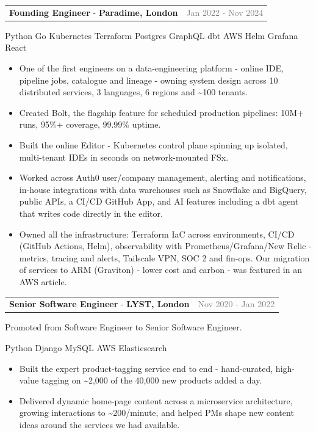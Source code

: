 \documentclass[10pt,a4paper]{extarticle}
\makeatletter
\newcommand{\role}[3]{%
  \vspace{3pt}\noindent\begin{tabularx}{\textwidth}{@{}Xr@{}}
  \textbf{#1} - \textbf{#2} & \textcolor{grey}{\small #3}
  \end{tabularx}\par}
\newcommand{\stack}[1]{{\footnotesize\color{accent}#1}\par\vspace{1pt}}
\newcommand{\progression}[1]{{\footnotesize\color{grey}#1}\par\vspace{1pt}}
\makeatother
\begin{document}
\role{Founding Engineer}{Paradime, London}{Jan 2022 - Nov 2024}
\stack{Python \textcolor{black}{\textbar{}} Go \textcolor{black}{\textbar{}} Kubernetes \textcolor{black}{\textbar{}} Terraform \textcolor{black}{\textbar{}} Postgres \textcolor{black}{\textbar{}} GraphQL \textcolor{black}{\textbar{}} dbt \textcolor{black}{\textbar{}} AWS \textcolor{black}{\textbar{}} Helm \textcolor{black}{\textbar{}} Grafana \textcolor{black}{\textbar{}} React}
\begin{itemize}
\item One of the first engineers on a data-engineering platform - online IDE, pipeline jobs, catalogue and lineage - owning system design across 10 distributed services, 3 languages, 6 regions and \textasciitilde100 tenants.
\item Created Bolt, the flagship feature for scheduled production pipelines: 10M+ runs, 95\%+ coverage, 99.99\% uptime.
\item Built the online Editor - Kubernetes control plane spinning up isolated, multi-tenant IDEs in seconds on network-mounted FSx.
\item Worked across Auth0 user/company management, alerting and notifications, in-house integrations with data warehouses such as Snowflake and BigQuery, public APIs, a CI/CD GitHub App, and AI features including a dbt agent that writes code directly in the editor.
\item Owned all the infrastructure: Terraform IaC across environments, CI/CD (GitHub Actions, Helm), observability with Prometheus/Grafana/New Relic - metrics, tracing and alerts, Tailscale VPN, SOC 2 and fin-ops. Our migration of services to ARM (Graviton) - lower cost and carbon - was featured in an AWS article.
\end{itemize}

\role{Senior Software Engineer}{LYST, London}{Nov 2020 - Jan 2022}
\progression{Promoted from Software Engineer to Senior Software Engineer.}
\stack{Python \textcolor{black}{\textbar{}} Django \textcolor{black}{\textbar{}} MySQL \textcolor{black}{\textbar{}} AWS \textcolor{black}{\textbar{}} Elasticsearch}
\begin{itemize}
\item Built the expert product-tagging service end to end - hand-curated, high-value tagging on \textasciitilde2,000 of the 40,000 new products added a day.
\item Delivered dynamic home-page content across a microservice architecture, growing interactions to \textasciitilde200/minute, and helped PMs shape new content ideas around the services we had available.
\end{itemize}
\end{document}
